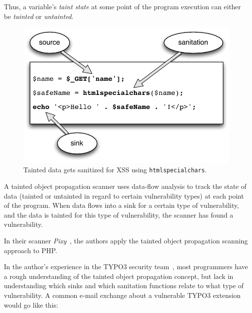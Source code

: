 Thus, a variable's \emph{taint state}\label{taint-state} at some point of the program execution can either be \emph{tainted} or \emph{untainted}.

\begin{figure}[htb]
  \begin{center}
    \includegraphics[scale=0.75]{images/taint-and-clean}
   \caption{Tainted data gets sanitized for XSS using \texttt{htmlspecialchars}.}
   \label{fig:taint-and-clean}
  \end{center}
\end{figure}

A tainted object propagation scanner uses data-flow analysis to track the state of data (tainted or untainted in regard to certain vulnerability types) at each point of the program. When data flows into a sink for a certain type of vulnerability, and the data is tainted for this type of vulnerability, the scanner has found a vulnerability.

In their scanner \emph{Pixy}~\cite{pixy-short, pixy-long, pixy-dissertation}, the authors apply the tainted object propagation scanning approach to PHP.

In the author's experience in the TYPO3 security team~\cite{security-team-members}, most programmers have a rough understanding of the tainted object  propagation concept, but lack in understanding which sinks and which sanitation functions relate to what type of vulnerability. A common e-mail exchange about a vulnerable TYPO3 extension would go like this:

